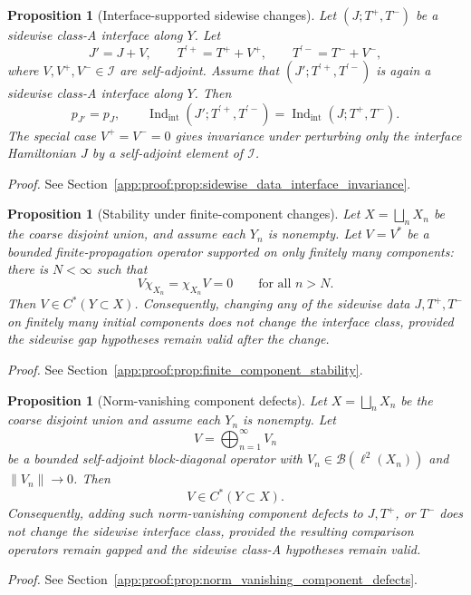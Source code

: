 \documentclass[11pt]{article}
\numberwithin{equation}{section}
\newtheorem{proposition}[theorem]{Proposition}
\theoremstyle{definition}
\theoremstyle{remark}
\newcommand{\proofref}[1]{%
  \par\noindent\emph{Proof.} See Section~\ref{#1}.\par\medskip
}
\newcommand{\proofappendixref}[1]{\proofref{#1}}
\newcommand{\Indint}{\operatorname{Ind}_{\mathrm{int}}}
\begin{document}
\begin{proposition}[Interface-supported sidewise changes]\label{prop:interface_supported_invariance}\label{prop:sidewise_data_interface_invariance}
Let $(J;T^+,T^-)$ be a sidewise class-A interface along $Y$. Let
\[
J'=J+V,\qquad T^{\prime +}=T^+ + V^+,\qquad T^{\prime -}=T^-+V^-,
\]
where $V,V^+,V^-\in\mathcal I$ are self-adjoint. Assume that
$(J';T^{\prime +},T^{\prime -})$ is again a sidewise class-A interface along $Y$. Then
\[
p_{J'}=p_J,
\qquad
\Indint(J';T^{\prime +},T^{\prime -})=\Indint(J;T^+,T^-).
\]
The special case \(V^+=V^-=0\) gives invariance under perturbing only the interface Hamiltonian
\(J\) by a self-adjoint element of \(\mathcal I\).
\end{proposition}
\proofappendixref{app:proof:prop:sidewise_data_interface_invariance}




\begin{proposition}[Stability under finite-component changes]\label{prop:finite_component_stability}
Let $X=\bigsqcup_n X_n$ be the coarse disjoint union, and assume each $Y_n$ is nonempty. Let
$V=V^*$ be a bounded finite-propagation operator supported on only finitely many components: there
is $N<\infty$ such that
\[
V\chi_{X_n}=\chi_{X_n}V=0
\qquad\text{for all }n>N.
\]
Then $V\in C^*(Y\subset X)$. Consequently, changing any of the sidewise data
$J,T^+,T^-$ on finitely many initial components does not change the interface class, provided the
sidewise gap hypotheses remain valid after the change.
\end{proposition}
\proofappendixref{app:proof:prop:finite_component_stability}




\begin{proposition}[Norm-vanishing component defects]\label{prop:norm_vanishing_component_defects}
Let \(X=\bigsqcup_nX_n\) be the coarse disjoint union and assume each \(Y_n\) is nonempty. Let
\[
V=\bigoplus_{n=1}^\infty V_n
\]
be a bounded self-adjoint block-diagonal operator with \(V_n\in\mathcal B(\ell^2(X_n))\) and
\(\|V_n\|\to0\). Then
\[
V\in C^*(Y\subset X).
\]
Consequently, adding such norm-vanishing component defects to \(J,T^+\), or \(T^-\) does not change
the sidewise interface class, provided the resulting comparison operators remain gapped and the
sidewise class-A hypotheses remain valid.
\end{proposition}
\proofappendixref{app:proof:prop:norm_vanishing_component_defects}
\end{document}
